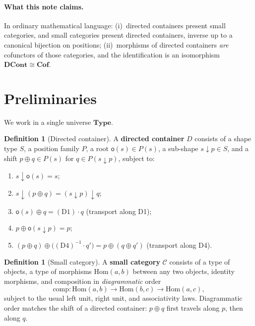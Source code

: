 \documentclass[11pt,a4paper]{article}
\theoremstyle{plain}
\theoremstyle{definition}
\newtheorem{definition}[theorem]{Definition}
\newcommand{\Type}{\mathbf{Type}}
\newcommand{\rootpos}{\mathsf{o}}
\newcommand{\sub}{\mathbin{\downarrow}}
\newcommand{\shift}{\oplus}
\newcommand{\DCont}{\mathbf{DCont}}
\newcommand{\Cof}{\mathbf{Cof}}
\newcommand{\Hom}{\mathrm{Hom}}
\begin{document}
\paragraph{What this note claims.}
In ordinary mathematical language: (i)~directed containers present small
categories, and small categories present directed containers, inverse up to a
canonical bijection on positions; (ii)~morphisms of directed containers
\emph{are} cofunctors of those categories, and the identification is an
isomorphism $\DCont\cong\Cof$.

\section{Preliminaries}

We work in a single universe $\Type$.

\begin{definition}[Directed container]\label{def:directed}
A \textbf{directed container} $D$ consists of a shape type $S$, a position
family $P$, a root $\rootpos(s)\in P(s)$, a sub-shape $s\sub p\in S$, and a
shift $p\shift q\in P(s)$ for $q\in P(s\sub p)$, subject to:
\begin{enumerate}
  \item[\textbf{D1.}] $s\sub\rootpos(s)=s$;
  \item[\textbf{D4.}] $s\sub(p\shift q)=(s\sub p)\sub q$;
  \item[\textbf{D2.}] $\rootpos(s)\shift q = (\mathrm{D1})\cdot q$
        (transport along D1);
  \item[\textbf{D3.}] $p\shift\rootpos(s\sub p)=p$;
  \item[\textbf{D5.}]
        $(p\shift q)\shift\bigl((\mathrm{D4})^{-1}\cdot q'\bigr)
        = p\shift(q\shift q')$
        (transport along D4).
\end{enumerate}
\end{definition}

\begin{definition}[Small category]\label{def:smallcat}
A \textbf{small category} $\mathcal{C}$ consists of a type of objects, a type
of morphisms $\Hom(a,b)$ between any two objects, identity morphisms, and
composition in \emph{diagrammatic} order
\[
  \mathrm{comp}:\Hom(a,b)\to\Hom(b,c)\to\Hom(a,c),
\]
subject to the usual left unit, right unit, and associativity laws.
Diagrammatic order matches the shift of a directed container: $p\shift q$
first travels along $p$, then along $q$.
\end{definition}
\end{document}
